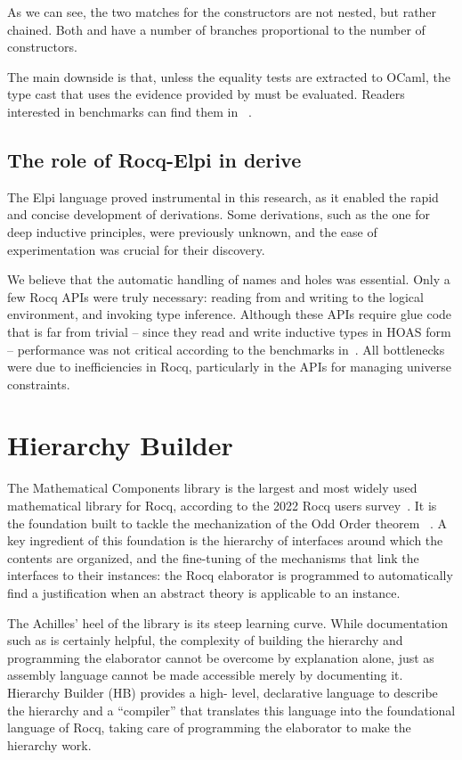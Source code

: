 \documentclass{these-ISSS}
\begin{document}
As we can see, the two matches for the constructors are not nested, but rather
chained. Both  and  have a number of branches
proportional to the number of constructors.


The main downside is that, unless the equality tests are extracted to OCaml,
the type cast that uses the evidence provided by  must be
evaluated. Readers interested in benchmarks can find them in
~\cite{gregoire:hal-03800154}.

\subsection{The role of Rocq-Elpi in derive}
The Elpi language proved instrumental in this research, as it enabled the
rapid and concise development of derivations. Some derivations, such as the one
for deep inductive principles, were previously unknown, and the ease of
experimentation was crucial for their discovery.

We believe that the automatic handling of names and holes was essential. Only a
few Rocq APIs were truly necessary: reading from and writing to the logical
environment, and invoking type inference. Although these APIs require glue code
that is far from trivial -- since they read and write inductive types in HOAS
form -- performance was not critical according to the benchmarks in~\cite{gregoire:hal-03800154}. All bottlenecks were due to inefficiencies
in Rocq, particularly in the APIs for managing universe constraints.


\newpage\section{Hierarchy Builder}\label{sec:hb}


The Mathematical Components library is the largest and most widely used
mathematical library for Rocq, according to the 2022 Rocq users
survey~\cite{dealmeidaborges_et_al:LIPIcs.ITP.2023.12}. It is the foundation
built to tackle the mechanization of the Odd Order theorem
~\cite{DBLP:conf/itp/GonthierAABCGRMOBPRSTT13}. A key ingredient of this
foundation is the hierarchy of interfaces around which the contents are
organized, and the fine-tuning of the mechanisms that link the interfaces to
their instances: the Rocq elaborator is programmed to automatically find a
justification when an abstract theory is applicable to an instance.

The Achilles' heel of the library is its steep learning curve. While documentation
such as \cite{assia_mahboubi_2022_7118596} is certainly helpful, the
complexity of building the hierarchy and programming the elaborator cannot be
overcome by explanation alone, just as assembly language cannot be made
accessible merely by documenting it. Hierarchy Builder (HB) provides a high-
level, declarative language to describe the hierarchy and a ``compiler'' that
translates this language into the foundational language of Rocq, taking care of
programming the elaborator to make the hierarchy work.
\end{document}
